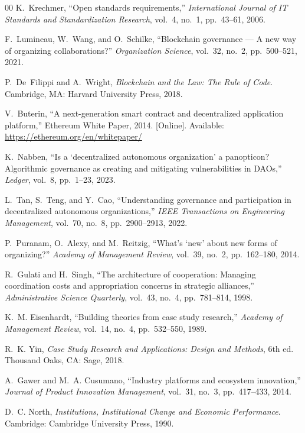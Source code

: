 \documentclass[conference]{IEEEtran}
\begin{document}
\begin{thebibliography}{00}
K.~Krechmer, ``Open standards requirements,'' \textit{International Journal
of IT Standards and Standardization Research}, vol.~4, no.~1, pp.~43--61,
2006.

F.~Lumineau, W.~Wang, and O.~Schilke, ``Blockchain governance --- A new way
of organizing collaborations?'' \textit{Organization Science}, vol.~32, no.~2,
pp.~500--521, 2021.

P.~De~Filippi and A.~Wright, \textit{Blockchain and the Law: The Rule of
Code}. Cambridge, MA: Harvard University Press, 2018.

V.~Buterin, ``A next-generation smart contract and decentralized application
platform,'' Ethereum White Paper, 2014. [Online]. Available:
\url{https://ethereum.org/en/whitepaper/}

K.~Nabben, ``Is a `decentralized autonomous organization' a panopticon?
Algorithmic governance as creating and mitigating vulnerabilities in DAOs,''
\textit{Ledger}, vol.~8, pp.~1--23, 2023.

L.~Tan, S.~Teng, and Y.~Cao, ``Understanding governance and participation in
decentralized autonomous organizations,'' \textit{IEEE Transactions on
Engineering Management}, vol.~70, no.~8, pp.~2900--2913, 2022.

P.~Puranam, O.~Alexy, and M.~Reitzig, ``What's `new' about new forms of
organizing?'' \textit{Academy of Management Review}, vol.~39, no.~2,
pp.~162--180, 2014.

R.~Gulati and H.~Singh, ``The architecture of cooperation: Managing
coordination costs and appropriation concerns in strategic alliances,''
\textit{Administrative Science Quarterly}, vol.~43, no.~4, pp.~781--814, 1998.

K.~M. Eisenhardt, ``Building theories from case study research,''
\textit{Academy of Management Review}, vol.~14, no.~4, pp.~532--550, 1989.

R.~K. Yin, \textit{Case Study Research and Applications: Design and Methods},
6th ed. Thousand Oaks, CA: Sage, 2018.

A.~Gawer and M.~A. Cusumano, ``Industry platforms and ecosystem innovation,''
\textit{Journal of Product Innovation Management}, vol.~31, no.~3,
pp.~417--433, 2014.

D.~C. North, \textit{Institutions, Institutional Change and Economic
Performance}. Cambridge: Cambridge University Press, 1990.

\end{thebibliography}

\vspace{12pt}
\end{document}
